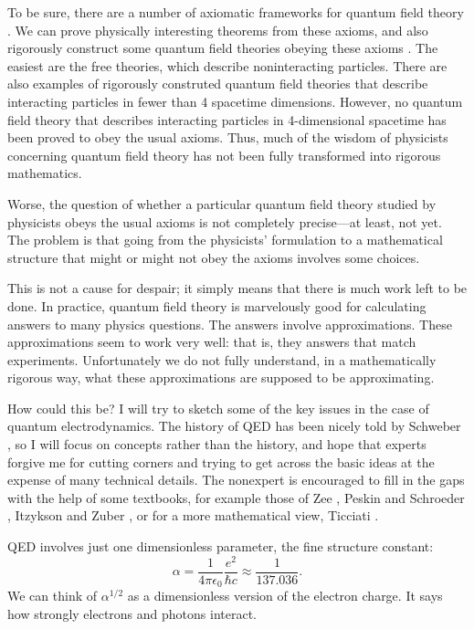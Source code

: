 \documentclass[12pt]{article}
\begin{document}
To be sure, there are a number of axiomatic frameworks for quantum field theory \cite{Haag,StreaterWightman}.  We can prove physically interesting theorems  from these axioms, and also rigorously construct some quantum field theories obeying these axioms \cite{BSZ,GlimmJaffe,Rivasseau}.  The easiest are the free theories,  which describe noninteracting particles.  There are also examples of rigorously  construted quantum field theories that describe interacting particles in fewer than 4 spacetime dimensions.  However, no quantum field theory that describes interacting particles in 4-dimensional spacetime has been proved to obey the usual axioms.   Thus, much of the wisdom of physicists concerning quantum field theory has not been fully transformed into rigorous mathematics.  

Worse, the question of whether a particular quantum field theory studied by physicists obeys the usual axioms is not completely precise---at least, not yet.  The problem is that going from the physicists' formulation to a mathematical structure that might or might not obey the axioms involves some choices.

This is not a cause for despair; it simply means that there is much work left to be done. In practice, quantum field theory is marvelously good for calculating answers to many physics questions.  The answers involve approximations.   These approximations seem to work very well: that is, they answers that match experiments.  Unfortunately we do not fully understand, in a mathematically rigorous way, what these approximations are supposed to be approximating.

How could this be?  I will try to sketch some of the key issues in the case of quantum electrodynamics.  The history of QED has been nicely told by Schweber \cite{Schweber}, so I will focus on concepts rather than the history, and hope that experts forgive me for cutting corners and trying to get across the basic ideas at the expense of many technical details.  The nonexpert is encouraged to fill in the gaps with the help of some textbooks, for example those of Zee \cite{Zee}, Peskin and Schroeder \cite{PS}, Itzykson and Zuber \cite{IZ}, or for a more mathematical view, Ticciati \cite{Ticciati}.

QED involves just one dimensionless parameter, the fine structure constant:
\[   \alpha = \frac{1}{4 \pi \epsilon_0} \frac{e^2}{\hbar c} \approx \frac{1}{137.036} .\]
We can think of $\alpha^{1/2}$ as a dimensionless version of the electron charge.  It  says how strongly electrons and photons interact.   
\end{document}

